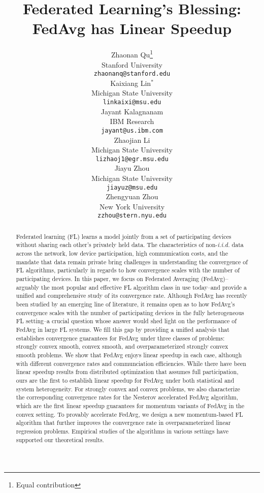 \documentclass{article}
\title{Federated Learning's Blessing:\\
FedAvg has Linear Speedup}
\author{%
  Zhaonan Qu\thanks{Equal contribution} \\
 Stanford University\\
  \texttt{zhaonanq@stanford.edu} \\
  \And
  Kaixiang Lin$^*$ \\
  Michigan State University \\
  \texttt{linkaixi@msu.edu} \\
  \AND
  Jayant Kalagnanam \\
  IBM Research \\
  \texttt{jayant@us.ibm.com} \\
  \And
  Zhaojian Li \\
  Michigan State University \\
  \texttt{lizhaoj1@egr.msu.edu} \\
  \And
  Jiayu Zhou\\
  Michigan State University \\
  \texttt{jiayuz@msu.edu} \\
  \And
  Zhengyuan Zhou\\
  New York University \\
  \texttt{zzhou@stern.nyu.edu} \\
}
\begin{document}
\maketitle

\begin{abstract}
\small Federated learning (FL) learns a model jointly from a set of participating devices without sharing each other's privately held data. The characteristics of non-\textit{i.i.d.} data across the network, low device participation, high communication costs, and the mandate that data remain private bring challenges in understanding the convergence of FL algorithms, particularly in regards to how convergence scales with the number of participating devices. In this paper, we focus on Federated Averaging (FedAvg)--arguably the most popular and effective FL algorithm class in use today--and provide a unified and comprehensive study of its convergence rate. Although FedAvg has recently been studied by an emerging line of literature, it remains open as to how FedAvg's convergence scales with the number of participating devices in the fully heterogeneous FL setting--a crucial question whose answer would shed light on the performance of FedAvg in large FL systems. We fill this gap by providing a unified analysis that establishes convergence guarantees for FedAvg under three classes of problems: strongly convex smooth, convex smooth, and overparameterized strongly convex smooth problems. We show that FedAvg enjoys linear speedup in each case, although with different convergence rates and communciation efficiencies. While there have been linear speedup results from distributed optimization that assumes full participation, ours are the first to establish linear speedup for FedAvg under both statistical and system heterogeneity.  For strongly convex and convex problems, we also characterize the corresponding convergence rates for the Nesterov accelerated FedAvg algorithm, which are the first linear speedup guarantees for momentum variants of FedAvg in the convex setting. To provably accelerate FedAvg, we design a new momentum-based FL algorithm that further improves the convergence rate in overparameterized linear regression problems. Empirical studies of the algorithms in various settings have supported our theoretical results.
\end{abstract}


%



%


% 



% 
\newpage



\newpage
\appendix

\end{document}
